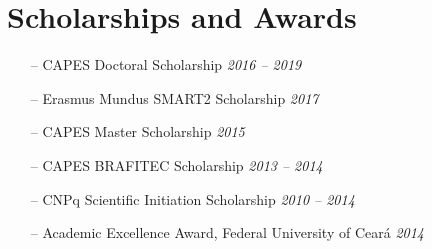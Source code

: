 \section{Scholarships and Awards}

\begin{itemize}
	\item[--] CAPES Doctoral Scholarship \hfill {\it 2016 -- 2019}
	\item[--] Erasmus Mundus SMART2 Scholarship \hfill {\it 2017}
	\item[--] CAPES Master Scholarship \hfill {\it 2015}
	\item[--] CAPES BRAFITEC Scholarship \hfill {\it 2013 -- 2014}
	\item[--] CNPq Scientific Initiation Scholarship \hfill {\it 2010 -- 2014}
	\item[--] Academic Excellence Award, Federal University of Cear\'a \hfill {\it 2014}
\end{itemize}











